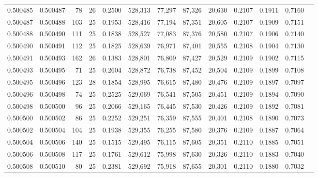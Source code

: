 \begin{tabular}{rrrrrrrrrrrrr}
0.500485 & 0.500487 &  78 &  26 &                                     0.2500 & 528,313 &  77,297 &  87,326 &  20,630 & 0.2107 & 0.1911 & 0.7160 \\
0.500487 & 0.500488 & 103 &  25 &                                     0.1953 & 528,416 &  77,194 &  87,351 &  20,605 & 0.2107 & 0.1909 & 0.7151 \\
0.500488 & 0.500490 & 111 &  25 &                                     0.1838 & 528,527 &  77,083 &  87,376 &  20,580 & 0.2107 & 0.1906 & 0.7140 \\
0.500490 & 0.500491 & 112 &  25 &                                     0.1825 & 528,639 &  76,971 &  87,401 &  20,555 & 0.2108 & 0.1904 & 0.7130 \\
0.500491 & 0.500493 & 162 &  26 &                                     0.1383 & 528,801 &  76,809 &  87,427 &  20,529 & 0.2109 & 0.1902 & 0.7115 \\
0.500493 & 0.500495 &  71 &  25 &                                     0.2604 & 528,872 &  76,738 &  87,452 &  20,504 & 0.2109 & 0.1899 & 0.7108 \\
0.500495 & 0.500496 & 123 &  28 &                                     0.1854 & 528,995 &  76,615 &  87,480 &  20,476 & 0.2109 & 0.1897 & 0.7097 \\
0.500496 & 0.500498 &  74 &  25 &                                     0.2525 & 529,069 &  76,541 &  87,505 &  20,451 & 0.2109 & 0.1894 & 0.7090 \\
0.500498 & 0.500500 &  96 &  25 &                                     0.2066 & 529,165 &  76,445 &  87,530 &  20,426 & 0.2109 & 0.1892 & 0.7081 \\
0.500500 & 0.500502 &  86 &  25 &                                     0.2252 & 529,251 &  76,359 &  87,555 &  20,401 & 0.2108 & 0.1890 & 0.7073 \\
0.500502 & 0.500504 & 104 &  25 &                                     0.1938 & 529,355 &  76,255 &  87,580 &  20,376 & 0.2109 & 0.1887 & 0.7064 \\
0.500504 & 0.500506 & 140 &  25 &                                     0.1515 & 529,495 &  76,115 &  87,605 &  20,351 & 0.2110 & 0.1885 & 0.7051 \\
0.500506 & 0.500508 & 117 &  25 &                                     0.1761 & 529,612 &  75,998 &  87,630 &  20,326 & 0.2110 & 0.1883 & 0.7040 \\
0.500508 & 0.500510 &  80 &  25 &                                     0.2381 & 529,692 &  75,918 &  87,655 &  20,301 & 0.2110 & 0.1880 & 0.7032 \\

\end{tabular}

